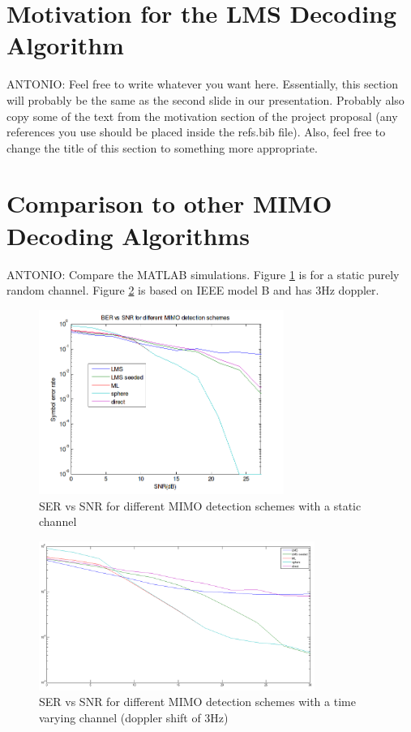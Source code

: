 \documentclass[journal]{IEEEtran}
\begin{document}
\section{Motivation for the LMS Decoding Algorithm}

ANTONIO:
Feel free to write whatever you want here. Essentially, this section will probably be the same as the second slide in our presentation.
Probably also copy some of the text from the motivation section of the project proposal (any references you use should be placed inside the refs.bib file).
Also, feel free to change the title of this section to something more appropriate.


\section{Comparison to other MIMO Decoding Algorithms}
\label{matlab_comparison_section}

ANTONIO:
Compare the MATLAB simulations. Figure \ref{ser_snr_different_schemes_static} is for a static purely random channel. Figure \ref{ser_snr_different_schemes_dynamic} is based on IEEE model B and has 3Hz doppler.

\begin{figure}[!h]
\centering
\includegraphics[width=8cm]{images/static_channel_decoder_comparison.png}
\caption{SER vs SNR for different MIMO detection schemes with a static channel}
\label{ser_snr_different_schemes_static}
\end{figure}

\begin{figure}[!h]
\centering
\includegraphics[width=9cm]{images/time_varying_channel_doppler_3.png}
\caption{SER vs SNR for different MIMO detection schemes with a time varying channel (doppler shift of 3Hz)}
\label{ser_snr_different_schemes_dynamic}
\end{figure}
\end{document}
